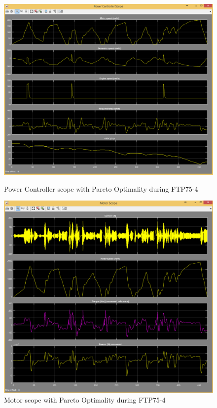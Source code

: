 \begin{figure}[hp]
\centering
\includegraphics[scale=0.4]{figures/Pareto/FTP75-4/powerController05Juli}
\caption{Power Controller scope with Pareto Optimality during FTP75-4}
\label{fig:pcpo4}
\includegraphics[scale=0.37]{figures/Pareto/FTP75-4/motor05Juli}
\caption{Motor scope with Pareto Optimality during FTP75-4}
\label{fig:mpo4}
\end{figure}

